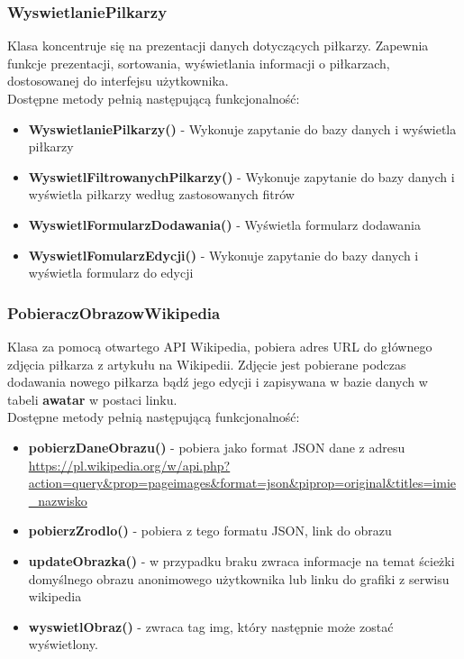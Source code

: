     \subsubsection{WyswietlaniePilkarzy}
        Klasa koncentruje się na prezentacji danych dotyczących piłkarzy. Zapewnia funkcje prezentacji, sortowania, wyświetlania informacji o piłkarzach, dostosowanej do interfejsu użytkownika.\\
        Dostępne metody pełnią następującą funkcjonalność: 
        \begin{itemize}
            \item \textbf{WyswietlaniePilkarzy()} -  Wykonuje zapytanie do bazy danych i wyświetla piłkarzy
            \item \textbf{WyswietlFiltrowanychPilkarzy()} - Wykonuje zapytanie do bazy danych i wyświetla piłkarzy według zastosowanych fitrów
            \item \textbf{WyswietlFormularzDodawania()} - Wyświetla formularz dodawania 
            \item \textbf{WyswietlFomularzEdycji()} - Wykonuje zapytanie do bazy danych i wyświetla formularz do edycji
        \end{itemize}
         



    \subsubsection{PobieraczObrazowWikipedia}
        Klasa za pomocą otwartego API Wikipedia, pobiera adres URL do głównego zdjęcia piłkarza z artykułu na Wikipedii. Zdjęcie jest pobierane podczas dodawania nowego piłkarza bądź jego edycji i zapisywana w bazie danych w tabeli \textbf{awatar} w postaci linku.\\
        Dostępne metody pełnią następującą funkcjonalność: 
        \begin{itemize}
            \item \textbf{pobierzDaneObrazu()} -  pobiera jako format JSON dane z adresu \url{https://pl.wikipedia.org/w/api.php?action=query&prop=pageimages&format=json&piprop=original&titles=imie_nazwisko}
            \item \textbf{pobierzZrodlo()} - pobiera z tego formatu JSON, link do obrazu
            \item \textbf{updateObrazka()} - w przypadku braku zwraca informacje na temat ścieżki domyślnego obrazu anonimowego użytkownika lub linku do grafiki z serwisu wikipedia
            \item \textbf{wyswietlObraz()} - zwraca tag img, który następnie może zostać wyświetlony.
        \end{itemize}
         


